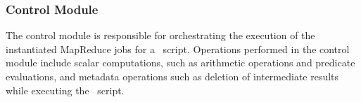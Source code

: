 

%
%
%

\subsubsection{Control Module}

The control module is responsible for orchestrating the execution of the instantiated MapReduce jobs for a \dmlr\ script. Operations
performed in the control module include scalar computations, such as arithmetic operations and predicate evaluations, and
metadata operations such as deletion of intermediate results while executing the \dmlr\ script.

